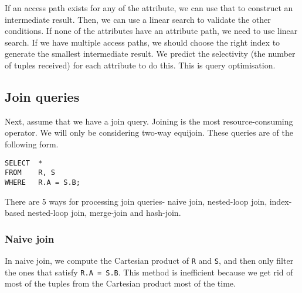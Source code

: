 \documentclass[a4paper, openany]{memoir}
\theoremstyle{definition}
\theoremstyle{plain}
\begin{document}
If an access path exists for any of the attribute, we can use that to construct an intermediate result. Then, we can use a linear search to validate the other conditions. If none of the attributes have an attribute path, we need to use linear search. If we have multiple access paths, we should choose the right index to generate the smallest intermediate result. We predict the selectivity (the number of tuples received) for each attribute to do this. This is query optimisation.

\subsection{Join queries}
Next, assume that we have a join query. Joining is the most resource-consuming operator. We will only be considering two-way equijoin. These queries are of the following form.
\begin{verbatim}
SELECT  *
FROM    R, S
WHERE   R.A = S.B;
\end{verbatim}
There are 5 ways for processing join queries- naive join, nested-loop join, index-based nested-loop join, merge-join and hash-join.
\subsubsection{Naive join}
In naive join, we compute the Cartesian product of \texttt{R} and \texttt{S}, and then only filter the ones that satisfy \texttt{R.A = S.B}. This method is inefficient because we get rid of most of the tuples from the Cartesian product most of the time.
\end{document}
